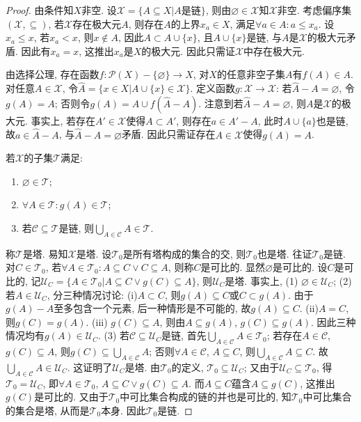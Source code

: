 \begin{proof}
\par 由条件知$X$非空. 设$\mathcal{X}=\{A\subseteq X| A\text{是链}\}$, 则由$\varnothing\in \mathcal{X}$知$\mathcal{X}$非空. 考虑偏序集$(\mathcal{X}, \subseteq)$, 若$\mathcal{X}$存在极大元$A$, 则存在$A$的上界$x_a\in X$, 满足$\forall a\in A: a\le x_a$. 设$x_a\le x$, 若$x_a < x$, 则$x\notin A$, 因此$A\subset A\cup \{x\}$, 且$A\cup \{x\}$是链, 与$A$是$\mathcal{X}$的极大元矛盾. 因此有$x_a=x$, 这推出$x_a$是$X$的极大元. 因此只需证$\mathcal{X}$中存在极大元. 
\par 由选择公理, 存在函数$f:\mathcal{P}(X)-\{\varnothing\}\to X$, 对$X$的任意非空子集$A$有$f(A)\in A$. 对任意$A\in \mathcal{X}$, 令$\hat{A}=\{x\in X\vert A\cup \{x\} \in \mathcal{X}\}$. 定义函数$g:\mathcal{X}\to \mathcal{X}$: 若$\hat{A}-A=\varnothing$, 令$g(A)=A$; 否则令$g(A)=A\cup f(\hat{A}-A)$. 注意到若$\hat{A}-A=\varnothing$, 则$A$是$\mathcal{X}$的极大元. 事实上, 若存在$A'\in \mathcal{X}$使得$A\subset A'$, 则存在$a\in A'-A$, 此时$A\cup \{a\}$也是链, 故$a\in \hat{A}-A$, 与$\hat{A}-A=\varnothing$矛盾. 因此只需证存在$A\in \mathcal{X}$使得$g(A)=A$. 
\par 若$\mathcal{X}$的子集$\mathcal{T}$满足:
\begin{enumerate}
    \item $\varnothing\in \mathcal{T}$;
    \item $\forall A\in \mathcal{T}: g(A)\in \mathcal{T}$;
    \item 若$\mathcal{C} \subseteq \mathcal{T}$是链, 则$\bigcup_{A\in \mathcal{C}} A \in \mathcal{T}$.
\end{enumerate}
称$\mathcal{T}$是塔. 易知$\mathcal{X}$是塔. 设$\mathcal{T}_0$是所有塔构成的集合的交, 则$\mathcal{T}_0$也是塔. 往证$\mathcal{T}_0$是链. 对$C\in \mathcal{T}_0$, 若$\forall A\in \mathcal{T}_0: A\subseteq C \lor C\subseteq A$, 则称$C$是可比的. 显然$\varnothing$是可比的. 设$C$是可比的, 记$\mathcal{U}_C=\{A\in \mathcal{T}_0\vert A\subseteq C \lor g(C)\subseteq A\}$, 则$\mathcal{U}_C$是塔. 事实上, (1) $\varnothing\in \mathcal{U}_C$; (2)若$A\in \mathcal{U}_C$, 分三种情况讨论: (i)$A\subset C$, 则$g(A)\subseteq C$或$C\subset g(A)$. 由于$g(A)-A$至多包含一个元素, 后一种情形是不可能的, 故$g(A)\subseteq C$. (ii)$A=C$, 则$g(C)=g(A)$. (iii) $g(C)\subseteq A$, 则由$A\subseteq g(A)$, $g(C)\subseteq g(A)$. 因此三种情况均有$g(A)\in \mathcal{U}_C$. (3) 若$\mathcal{C} \subseteq \mathcal{U}_C$是链, 首先$\bigcup_{A\in \mathcal{C}} A \in \mathcal{T}_0$; 若存在$A\in \mathcal{C}$, $g(C)\subseteq A$, 则$g(C)\subseteq \bigcup_{A\in \mathcal{C}} A$; 否则$\forall A\in \mathcal{C}$, $A\subseteq C$, 则$\bigcup_{A\in \mathcal{C}} A\subseteq C$. 故$\bigcup_{A\in \mathcal{C}} A \in \mathcal{U}_C$. 这证明了$\mathcal{U}_C$是塔. 由$\mathcal{T}_0$的定义, $\mathcal{T}_0\subseteq \mathcal{U}_C$; 又由于$\mathcal{U}_C\subseteq\mathcal{T}_0$, 得$\mathcal{T}_0=\mathcal{U}_C$, 即$\forall A\in \mathcal{T}_0$, $A\subseteq C \lor g(C)\subseteq A$. 而$A\subseteq C$蕴含$A\subseteq g(C)$, 这推出$g(C)$是可比的. 又由于$\mathcal{T}_0$中可比集合构成的链的并也是可比的, 知$\mathcal{T}_0$中可比集合的集合是塔, 从而是$\mathcal{T}_0$本身. 因此$\mathcal{T}_0$是链.

\end{proof}
